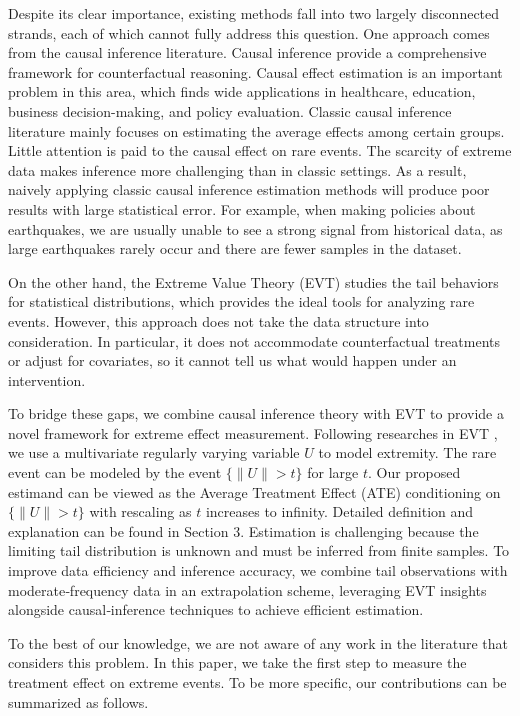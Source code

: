 \documentclass[12pt]{article}
\theoremstyle{plain}
\theoremstyle{definition}
\begin{document}
Despite its clear importance, existing methods fall into two largely disconnected strands, each of which cannot fully address this question. One approach comes from the causal inference literature. Causal inference provide a comprehensive framework for counterfactual reasoning. Causal effect estimation is an important problem in this area, which finds wide applications in healthcare, education, business decision-making, and policy evaluation.  Classic causal inference literature mainly focuses on estimating the average effects among certain groups. Little attention is paid to the causal effect on rare events. The scarcity of extreme data makes inference more challenging than in classic settings. As a result, naively applying classic causal inference estimation methods will produce poor results with large statistical error.  For example, when making policies about earthquakes, we are usually unable to see a strong signal from historical data, as large earthquakes rarely occur and there are fewer samples in the dataset.

On the other hand, the Extreme Value Theory (EVT) studies the tail behaviors for statistical distributions, which provides the ideal tools for analyzing rare events. However, this approach does not take the data structure into consideration. In particular, it does not accommodate counterfactual treatments or adjust for covariates, so it cannot tell us what would happen under an intervention. 

To bridge these gaps, we combine causal inference theory with EVT to provide a novel framework for extreme effect measurement. Following researches in EVT \cite{coles2001introduction}, we use a multivariate regularly varying variable $U$ to model extremity. The rare event can be modeled by the event $\{\|U\| > t\}$ for large $t$. Our proposed estimand can be viewed as the Average Treatment Effect (ATE) conditioning on $\{\|U\| > t\}$ with rescaling as $t$ increases to infinity. Detailed definition and explanation can be found in Section 3. Estimation is challenging because the limiting tail distribution is unknown and must be inferred from finite samples. To improve data efficiency and inference accuracy, we combine tail observations with moderate‐frequency data in an extrapolation scheme, leveraging EVT insights alongside causal‐inference techniques to achieve efficient estimation.

To the best of our knowledge, we are not aware of any work in the literature that considers this problem. In this paper, we take the first step to measure the treatment effect on extreme events. To be more specific, our contributions can be summarized as follows. 
\end{document}
